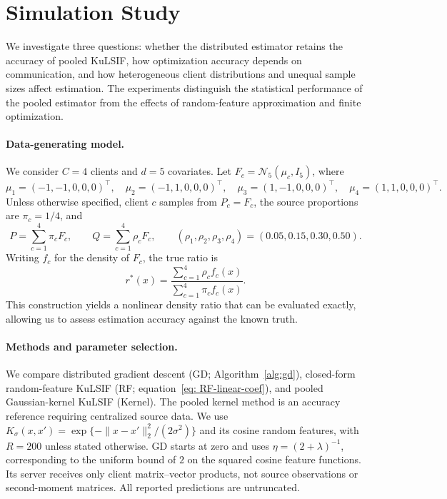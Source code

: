 \section{Simulation Study}\label{Sec: simulation}

We investigate three questions: whether the distributed estimator retains the
accuracy of pooled KuLSIF, how optimization accuracy depends on communication,
and how heterogeneous client distributions and unequal sample sizes affect
estimation. The experiments distinguish the statistical performance of the
pooled estimator from the effects of random-feature approximation and finite
optimization.

\paragraph{Data-generating model.}
We consider $C=4$ clients and $d=5$ covariates. Let
$F_c=\mathcal{N}_5(\mu_c,I_5)$, where
\[
\mu_1=(-1,-1,0,0,0)^\top,\quad
\mu_2=(-1,1,0,0,0)^\top,\quad
\mu_3=(1,-1,0,0,0)^\top,\quad
\mu_4=(1,1,0,0,0)^\top.
\]
Unless otherwise specified, client $c$ samples from $P_c=F_c$, the source
proportions are $\pi_c=1/4$, and
\[
P=\sum_{c=1}^4\pi_cF_c,\qquad
Q=\sum_{c=1}^4\rho_cF_c,\qquad
(\rho_1,\rho_2,\rho_3,\rho_4)=(0.05,0.15,0.30,0.50).
\]
Writing $f_c$ for the density of $F_c$, the true ratio is
\[
r^*(x)=\frac{\sum_{c=1}^4\rho_cf_c(x)}
                 {\sum_{c=1}^4\pi_cf_c(x)}.
\]
This construction yields a nonlinear density ratio that can be evaluated
exactly, allowing us to assess estimation accuracy against the known truth.

\paragraph{Methods and parameter selection.}
We compare distributed gradient descent (GD; Algorithm~\ref{alg:gd}),
closed-form random-feature KuLSIF (RF; equation~\eqref{eq: RF-linear-coef}),
and pooled Gaussian-kernel KuLSIF (Kernel). The pooled kernel method is an
accuracy reference requiring centralized source data. We use
$K_\sigma(x,x')=\exp\{-\|x-x'\|_2^2/(2\sigma^2)\}$ and its cosine random
features, with $R=200$ unless stated otherwise. GD starts at zero and uses
$\eta=(2+\lambda)^{-1}$, corresponding to the uniform bound of $2$ on the
squared cosine feature functions. Its server receives only client
matrix--vector products, not source observations or second-moment matrices.
All reported predictions are untruncated.

